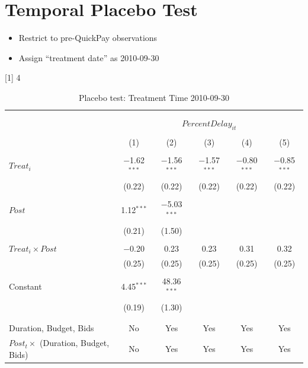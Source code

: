 \documentclass[
]{article}
\providecommand{\tightlist}{%
  \setlength{\itemsep}{0pt}\setlength{\parskip}{0pt}}
\begin{document}
\hypertarget{temporal-placebo-test}{%
\section{Temporal Placebo Test}\label{temporal-placebo-test}}

\begin{itemize}
\tightlist
\item
  Restrict to pre-QuickPay observations
\item
  Assign ``treatment date'' as 2010-09-30
\end{itemize}

{[}1{]} 4

\begin{table}[H] \centering 
  \caption{Placebo test: Treatment Time 2010-09-30} 
  \label{} 
\small 
\begin{tabular}{@{\extracolsep{-2pt}}lccccc} 
\\[-1.8ex]\hline 
\hline \\[-1.8ex] 
\\[-1.8ex] & \multicolumn{5}{c}{$PercentDelay_{it}$} \\ 
\\[-1.8ex] & (1) & (2) & (3) & (4) & (5)\\ 
\hline \\[-1.8ex] 
 $Treat_i$ & $-$1.62$^{***}$ & $-$1.56$^{***}$ & $-$1.57$^{***}$ & $-$0.80$^{***}$ & $-$0.85$^{***}$ \\ 
  & (0.22) & (0.22) & (0.22) & (0.22) & (0.22) \\ 
  & & & & & \\ 
 $Post$ & 1.12$^{***}$ & $-$5.03$^{***}$ &  &  &  \\ 
  & (0.21) & (1.50) &  &  &  \\ 
  & & & & & \\ 
 $Treat_i \times Post$ & $-$0.20 & 0.23 & 0.23 & 0.31 & 0.32 \\ 
  & (0.25) & (0.25) & (0.25) & (0.25) & (0.25) \\ 
  & & & & & \\ 
 Constant & 4.45$^{***}$ & 48.36$^{***}$ &  &  &  \\ 
  & (0.19) & (1.30) &  &  &  \\ 
  & & & & & \\ 
\hline \\[-1.8ex] 
Duration, Budget, Bids & No & Yes & Yes & Yes & Yes \\ 
$Post_t \times$  (Duration, Budget, Bids) & No & Yes & Yes & Yes & Yes \\ 

\end{tabular}
\end{table}
\end{document}
